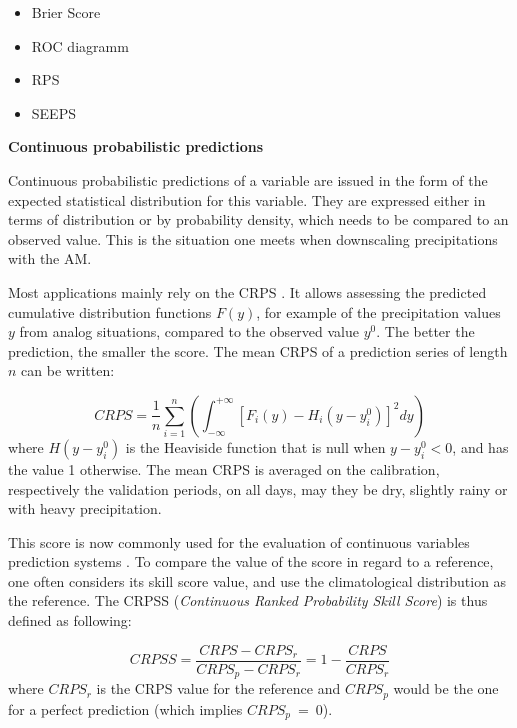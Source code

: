 \documentclass[review]{elsarticle}
\begin{document}
\begin{itemize}
	\setlength\itemsep{-1mm}
	\item Brier Score \citep{Brier1950}
	\item ROC diagramm \citep[Relative Operating Characteristic or Receiver Operating Characteristic,][]{Mason1982}
	\item RPS \citep[Ranked Probability Score,][]{Epstein1969}
	\item SEEPS \citep[Stable Equitable Error in Probability Space,][]{Rodwell2010,Rodwell2011}
\end{itemize}


\textbf{Continuous probabilistic predictions}
\label{sec:prob_forecasts}

Continuous probabilistic predictions of a variable are issued in the form of the expected statistical distribution for this variable. They are expressed either in terms of distribution or by probability density, which needs to be compared to an observed value. This is the situation one meets when downscaling precipitations with the AM.

Most applications mainly rely on the CRPS \citep[Continuous Ranked Probability Score,][]{Brown1974, Matheson1976, Hersbach2000}. It allows assessing the predicted cumulative distribution functions $F(y)$, for example of the precipitation values $y$ from analog situations, compared to the observed value $y^{0}$. The better the prediction, the smaller the score. The mean CRPS of a prediction series of length $n$ can be written:

\begin{equation}
\label{eq:CRPS}
CRPS = \frac{1}{n} \sum_{i=1}^{n} \left(  \int_{-\infty}^{+\infty} \left[ F_{i}(y)-H_{i}(y-y_{i}^{0})\right]^{2} dy \right) 
\end{equation}
where $H(y-y_{i}^{0})$ is the Heaviside function that is null when $y-y_{i}^{0}<0$, and has the value 1 otherwise. The mean CRPS is averaged on the calibration, respectively the validation periods, on all days, may they be dry, slightly rainy or with heavy precipitation.

This score is now commonly used for the evaluation of continuous variables prediction systems \citep{Casati2008, Marty2010}. To compare the value of the score in regard to a reference, one often considers its skill score value, and use the climatological distribution as the reference. The CRPSS (\textit{Continuous Ranked Probability Skill Score}) is thus defined as following:

\begin{equation}
\label{eq:CRPSS}
CRPSS = \frac{CRPS-CRPS_{r}}{CRPS_{p}-CRPS_{r}} = 1-\frac{CRPS}{CRPS_{r}}
\end{equation}
where $CRPS_{r}$ is the CRPS value for the reference and $CRPS_{p}$ would be the one for a perfect prediction (which implies $CRPS_{p}~=~0$).
\end{document}
